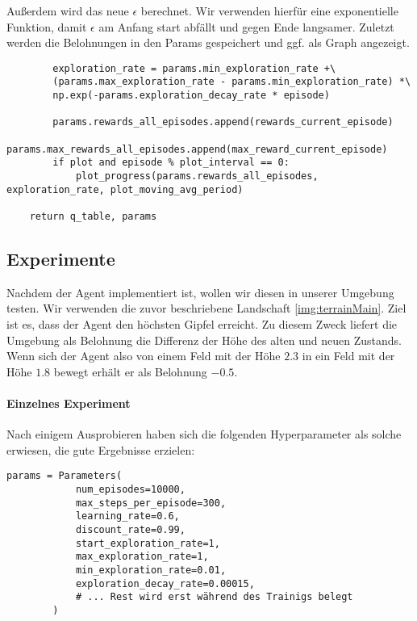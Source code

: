 Außerdem wird das neue $ \epsilon $ berechnet. Wir verwenden hierfür eine exponentielle Funktion, damit $ \epsilon $ am Anfang start abfällt und gegen Ende langsamer. Zuletzt werden die Belohnungen in den Params gespeichert und ggf. als Graph angezeigt.
\begin{verbatim}
        exploration_rate = params.min_exploration_rate +\
        (params.max_exploration_rate - params.min_exploration_rate) *\
        np.exp(-params.exploration_decay_rate * episode)

        params.rewards_all_episodes.append(rewards_current_episode)
        params.max_rewards_all_episodes.append(max_reward_current_episode)
        if plot and episode % plot_interval == 0:
            plot_progress(params.rewards_all_episodes, exploration_rate, plot_moving_avg_period)

    return q_table, params
\end{verbatim}

\smallspace

\subsection{Experimente}
Nachdem der Agent implementiert ist, wollen wir diesen in unserer Umgebung testen. Wir verwenden die zuvor beschriebene Landschaft \ref{img:terrainMain}. Ziel ist es, dass der Agent den höchsten Gipfel erreicht. Zu diesem Zweck liefert die Umgebung als Belohnung die Differenz der Höhe des alten und neuen Zustands. Wenn sich der Agent also von einem Feld mit der Höhe $ 2.3 $ in ein Feld mit der Höhe $ 1.8 $ bewegt erhält er als Belohnung $ -0.5 $.

\paragraph{Einzelnes Experiment}
Nach einigem Ausprobieren haben sich die folgenden Hyperparameter als solche erwiesen, die gute Ergebnisse erzielen:
\begin{verbatim}
params = Parameters(
            num_episodes=10000,
            max_steps_per_episode=300,
            learning_rate=0.6,
            discount_rate=0.99,
            start_exploration_rate=1,
            max_exploration_rate=1,
            min_exploration_rate=0.01,
            exploration_decay_rate=0.00015,
            # ... Rest wird erst während des Trainigs belegt
        )
\end{verbatim}

